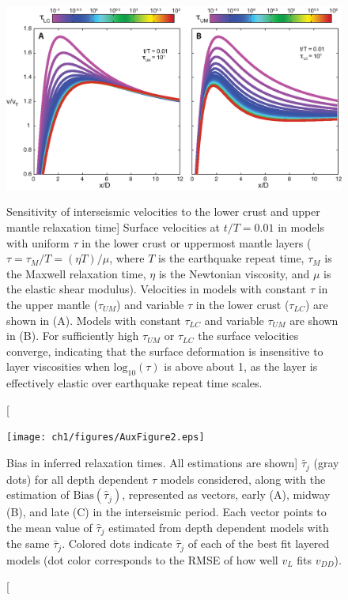 \begin{figure}
\includegraphics{ch1/figures/AuxFigure1.eps}
\caption
[Sensitivity of interseismic velocities to the lower crust and upper
mantle relaxation time]
{Surface velocities at $t/T = 0.01$ in models with uniform
$\tau$ in the lower crust or uppermost mantle layers ($\tau = \tau_M/T
= (\eta T)/\mu$, where $T$ is the earthquake repeat time, $\tau_M$ is
the Maxwell relaxation time, $\eta$ is the Newtonian viscosity, and
$\mu$ is the elastic shear modulus).  Velocities in models with
constant $\tau$ in the upper mantle ($\tau_{UM}$) and variable $\tau$ in
the lower crust ($\tau_{LC}$) are shown in (A).  Models with constant
$\tau_{LC}$ and variable $\tau_{UM}$ are shown in (B).  For
sufficiently high $\tau_{UM}$ or $\tau_{LC}$ the surface velocities
converge, indicating that the surface deformation is insensitive to
layer viscosities when $\mathrm{log}_{10}(\tau)$ is above about 1, as
the layer is effectively elastic over earthquake repeat time scales.}
\label{ch1:fig:A1}
\end{figure}

\begin{figure}
\texttt{[image: ch1/figures/AuxFigure2.eps]}
\caption
[Bias in inferred relaxation times. All estimations are shown]
{$\bar{\tau}_j$ (gray dots) for all depth dependent $\tau$ models
considered, along with the estimation of
$\mathrm{Bias}(\hat{\tau}_j)$, represented as vectors, early (A),
midway (B), and late (C) in the interseismic period.  Each vector
points to the mean value of $\hat{\tau}_j$ estimated from depth
dependent models with the same $\bar{\tau}_j$.  Colored dots indicate
$\hat{\tau}_j$ of each of the best fit layered models (dot color
corresponds to the RMSE of how well $v_L$ fits $v_{DD}$).}
\label{ch1:fig:A2}
\end{figure}

